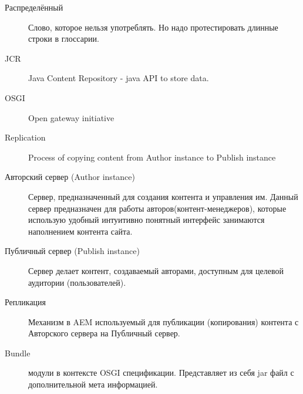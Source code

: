 \Defines %
\begin{description}
\item[Распределённый] Слово, которое нельзя употреблять. Но надо протестировать длинные строки в глоссарии.
\item[JCR] Java Content Repository - java API to store data.
\item[OSGI] Open gateway initiative
\item[Replication] Process of copying content from Author instance to Publish instance
\item[Авторский сервер (Author instance)] Сервер, предназначенный для создания контента и управления им. Данный сервер предназначен для работы авторов(контент-менеджеров), которые использую удобный интуитивно понятный интерфейс занимаются наполнением контента сайта. 
\item[Публичный сервер (Publish instance)] Сервер делает контент, создаваемый авторами, доступным для целевой аудитории (пользователей).
\item[Репликация] Механизм в AEM используемый для публикации (копирования) контента с Авторского сервера на Публичный сервер.
\item[Bundle] модули в контексте OSGI спецификации. Представляет из себя jar файл с дополнительной мета информацией.
\end{description}

